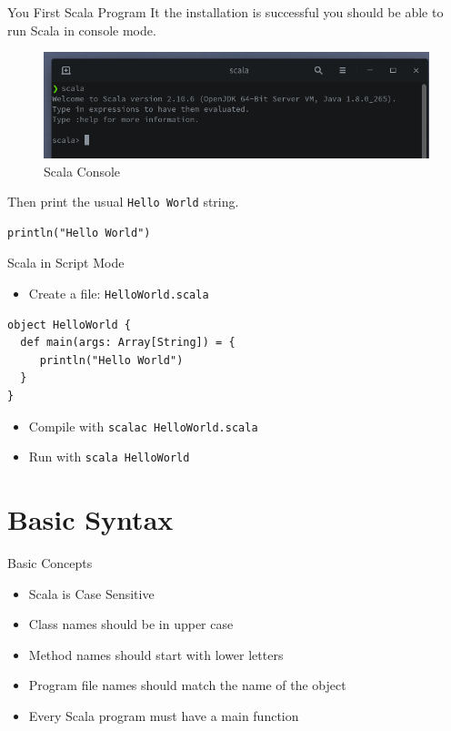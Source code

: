 \documentclass[presentation, aspectratio=169]{beamer}
\begin{document}
\begin{frame}[label={sec:org57426ff},fragile]{You First Scala Program}
 It the installation is successful you should be able to run Scala in 
console mode.
\begin{figure}[htbp]
\centering
\includegraphics[width=.9\linewidth]{./img/scala-console.png}
\caption{\label{fig:orgccc9a23}Scala Console}
\end{figure}

Then print the usual \texttt{Hello World} string.
\begin{verbatim}
println("Hello World")
\end{verbatim}
\end{frame}


\begin{frame}[label={sec:org84e8ca4},fragile]{Scala in Script Mode}
 \begin{itemize}
\item Create a file: \texttt{HelloWorld.scala}
\end{itemize}
\begin{verbatim}
object HelloWorld {
  def main(args: Array[String]) = {
     println("Hello World")
  }
}
\end{verbatim}
\begin{itemize}
\item Compile with  \texttt{scalac HelloWorld.scala}
\item Run with \texttt{scala HelloWorld}
\end{itemize}
\end{frame}

\section{Basic Syntax}
\label{sec:orga51a80c}

\begin{frame}[label={sec:org88ee854}]{Basic Concepts}
\begin{itemize}
\item Scala is Case Sensitive
\item Class names should be in upper case
\item Method names should start with lower letters
\item Program file names should match the name of the object
\item Every Scala program must have a main function
\end{itemize}
\end{frame}
\end{document}
